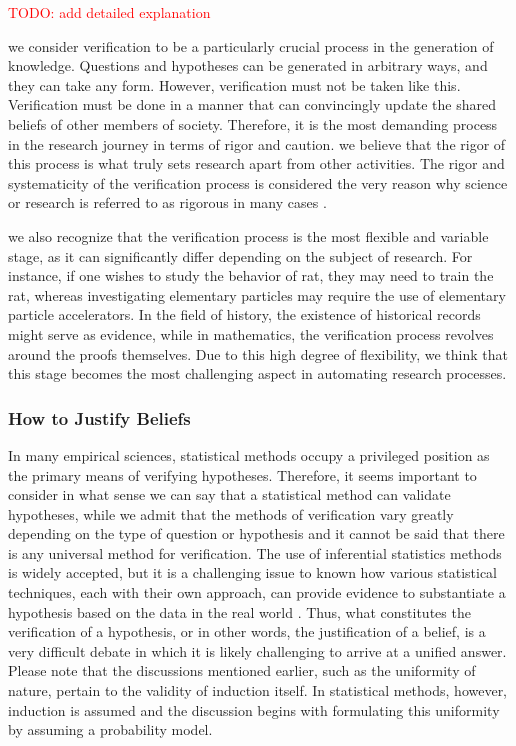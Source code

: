 \documentclass{book}
\begin{document}
\textcolor{red}{TODO: add detailed explanation}

we consider verification to be a particularly crucial process in the generation of knowledge. Questions and hypotheses can be generated in arbitrary ways, and they can take any form. However, verification must not be taken like this. Verification must be done in a manner that can convincingly update the shared beliefs of other members of society. Therefore, it is the most demanding process in the research journey in terms of rigor and caution. we believe that the rigor of this process is what truly sets research apart from other activities. The rigor and systematicity of the verification process is considered the very reason why science or research is referred to as rigorous in many cases \cite{sep-scientific-method,hoyningen2008systematicity,haack2003defending}.

we also recognize that the verification process is the most flexible and variable stage, as it can significantly differ depending on the subject of research. For instance, if one wishes to study the behavior of rat, they may need to train the rat, whereas investigating elementary particles may require the use of elementary particle accelerators. In the field of history, the existence of historical records might serve as evidence, while in mathematics, the verification process revolves around the proofs themselves. Due to this high degree of flexibility, we think that this stage becomes the most challenging aspect in automating research processes.

\subsubsection{How to Justify Beliefs}
In many empirical sciences, statistical methods occupy a privileged position as the primary means of verifying hypotheses. Therefore, it seems important to consider in what sense we can say that a statistical method can validate hypotheses, while we admit that the methods of verification vary greatly depending on the type of question or hypothesis and it cannot be said that there is any universal method for verification. The use of inferential statistics methods is widely accepted, but it is a challenging issue to known how various statistical techniques, each with their own approach, can provide evidence to substantiate a hypothesis based on the data in the real world \cite{otsuka2022thinking,sober2008evidence,sep-statistics}. Thus, what constitutes the verification of a hypothesis, or in other words, the justification of a belief, is a very difficult debate in which it is likely challenging to arrive at a unified answer. Please note that the discussions mentioned earlier, such as the uniformity of nature, pertain to the validity of induction itself. In statistical methods, however, induction is assumed and the discussion begins with formulating this uniformity by assuming a probability model. 
\end{document}
